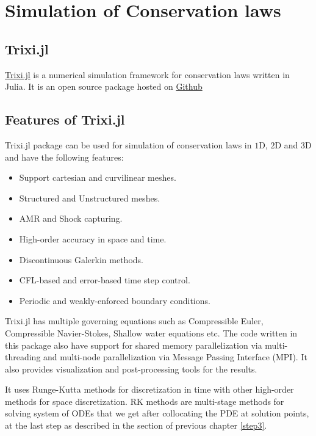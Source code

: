 \makeatletter
\setlength{\@fptop}{0pt}
\makeatother
\section[Simulation]{Simulation of Conservation laws}
\subsection{Trixi.jl}
\href{https://github.com/trixi-framework/Trixi.jl}{\ttfamily Trixi.jl} \cite{trixi} is a numerical simulation framework for conservation laws written in {\ttfamily Julia}. It is an open source package hosted on \href{https://www.github.com}{Github}
\subsection{Features of {\ttfamily Trixi.jl}}

{\ttfamily Trixi.jl} package can be used for simulation of conservation laws in $1$D, $2$D and $3$D and have the following features:
\begin{itemize}
    \item Support cartesian and curvilinear meshes.
    \item Structured and Unstructured meshes.
    \item AMR and Shock capturing.
    \item High-order accuracy in space and time.
    \item Discontinuous Galerkin methods.
    \item CFL-based and error-based time step control.
    \item Periodic and weakly-enforced boundary conditions.
\end{itemize}
{\ttfamily Trixi.jl} has multiple governing equations such as Compressible Euler, \linebreak Compressible Navier-Stokes, Shallow water equations etc. The code written in this package also have support for shared memory parallelization via multi-threading and multi-node parallelization via {\ttfamily Message Passing Interface (MPI)}. It also provides visualization and post-processing tools for the results.

It uses Runge-Kutta methods for discretization in time with other high-order methods for space discretization. RK methods are multi-stage methods for solving system of ODEs that we get after collocating the PDE at solution points, at the last step as described in the section of previous chapter \ref{step3}.


